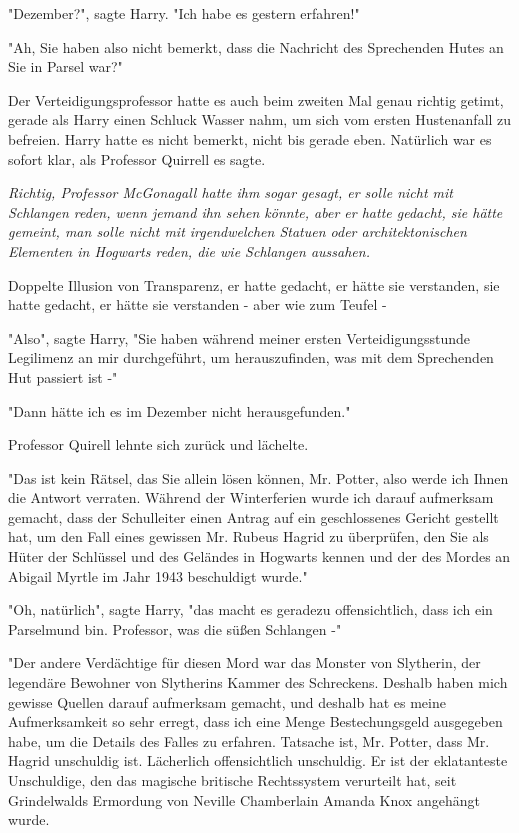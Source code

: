 {"Dezember?", sagte Harry. "Ich habe es gestern erfahren!"

"Ah, Sie haben also nicht bemerkt, dass die Nachricht des Sprechenden Hutes an Sie in Parsel war?"

Der Verteidigungsprofessor hatte es auch beim zweiten Mal genau richtig getimt, gerade als Harry einen Schluck Wasser nahm, um sich vom ersten Hustenanfall zu befreien. Harry hatte es nicht bemerkt, nicht bis gerade eben. Natürlich war es sofort klar, als Professor Quirrell es sagte.

\emph{Richtig, Professor McGonagall hatte ihm sogar gesagt, er solle nicht mit Schlangen reden, wenn jemand ihn sehen könnte, aber er hatte gedacht, sie hätte gemeint, man solle nicht mit irgendwelchen Statuen oder architektonischen Elementen in Hogwarts reden, die wie Schlangen aussahen.}

Doppelte Illusion von Transparenz, er hatte gedacht, er hätte sie verstanden, sie hatte gedacht, er hätte sie verstanden - aber wie zum Teufel -

"Also", sagte Harry, "Sie haben während meiner ersten Verteidigungsstunde Legilimenz an mir durchgeführt, um herauszufinden, was mit dem Sprechenden Hut passiert ist -"

"Dann hätte ich es im Dezember nicht herausgefunden."

Professor Quirell lehnte sich zurück und lächelte.

"Das ist kein Rätsel, das Sie allein lösen können, Mr. Potter, also werde ich Ihnen die Antwort verraten. Während der Winterferien wurde ich darauf aufmerksam gemacht, dass der Schulleiter einen Antrag auf ein geschlossenes Gericht gestellt hat, um den Fall eines gewissen Mr. Rubeus Hagrid zu überprüfen, den Sie als Hüter der Schlüssel und des Geländes in Hogwarts kennen und der des Mordes an Abigail Myrtle im Jahr 1943 beschuldigt wurde."

"Oh, natürlich", sagte Harry, "das macht es geradezu offensichtlich, dass ich ein Parselmund bin. Professor, was die süßen Schlangen -"

"Der andere Verdächtige für diesen Mord war das Monster von Slytherin, der legendäre Bewohner von Slytherins Kammer des Schreckens. Deshalb haben mich gewisse Quellen darauf aufmerksam gemacht, und deshalb hat es meine Aufmerksamkeit so sehr erregt, dass ich eine Menge Bestechungsgeld ausgegeben habe, um die Details des Falles zu erfahren. Tatsache ist, Mr. Potter, dass Mr. Hagrid unschuldig ist. Lächerlich offensichtlich unschuldig. Er ist der eklatanteste Unschuldige, den das magische britische Rechtssystem verurteilt hat, seit Grindelwalds Ermordung von Neville Chamberlain Amanda Knox angehängt wurde.

}
